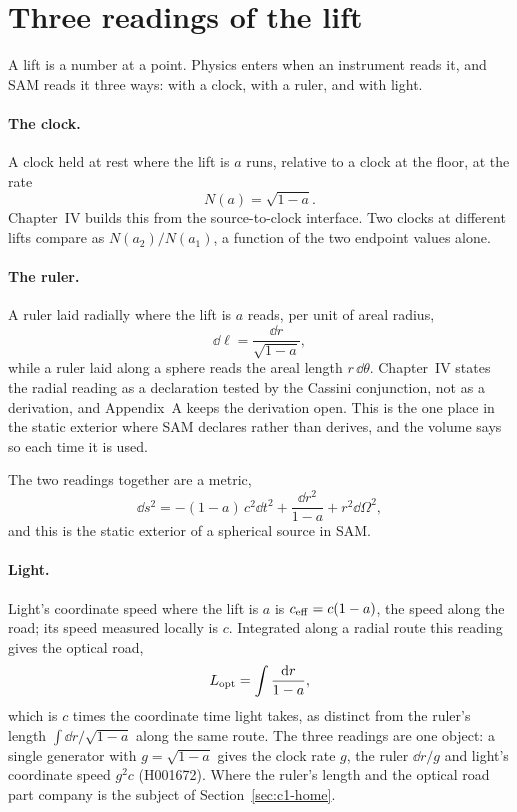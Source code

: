 \section{Three readings of the lift}
\label{sec:c1-readings}

A lift is a number at a point. Physics enters when an instrument reads it, and SAM reads it three ways: with a clock, with a ruler, and with light.

\paragraph{The clock.} A clock held at rest where the lift is $a$ runs, relative to a clock at the floor, at the rate
\begin{equation}
N(a)=\sqrt{1-a}.
\label{eq:c1-clock}
\end{equation}
Chapter~IV builds this from the source-to-clock interface. Two clocks at different lifts compare as $N(a_2)/N(a_1)$, a function of the two endpoint values alone.

\paragraph{The ruler.} A ruler laid radially where the lift is $a$ reads, per unit of areal radius,
\begin{equation}
\dd\ell=\frac{\dd r}{\sqrt{1-a}},
\label{eq:c1-ruler}
\end{equation}
while a ruler laid along a sphere reads the areal length $r\,\dd\theta$. Chapter~IV states the radial reading as a declaration tested by the Cassini conjunction, not as a derivation, and Appendix~A keeps the derivation open. This is the one place in the static exterior where SAM declares rather than derives, and the volume says so each time it is used.

The two readings together are a metric,
\begin{equation}
\dd s^2=-(1-a)\,c^2\dd t^2+\frac{\dd r^2}{1-a}+r^2\dd\Omega^2,
\label{eq:c1-metric}
\end{equation}
and this is the static exterior of a spherical source in SAM.

\paragraph{Light.} Light's coordinate speed where the lift is $a$ is $c_{\rm eff}=c(1-a)$, the speed along the road; its speed measured locally is $c$. Integrated along a radial route this reading gives the optical road,
\begin{equation}
L_{\rm opt}=\int\frac{\mathrm{d} r}{1-a},
\label{eq:c1-optical-road}
\end{equation}
which is $c$ times the coordinate time light takes, as distinct from the ruler's length $\int\dd r/\sqrt{1-a}$ along the same route. The three readings are one object: a single generator with $g=\sqrt{1-a}$ gives the clock rate $g$, the ruler $\dd r/g$ and light's coordinate speed $g^2c$ (H001672). Where the ruler's length and the optical road part company is the subject of Section~\ref{sec:c1-home}.

